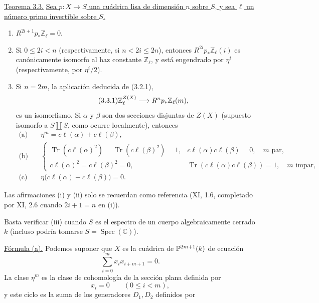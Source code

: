 \medskip
\noindent\underline{Teorema 3.3.}\quad
\underline{Sea $p:X\longrightarrow S$ una cuádrica lisa de dimensión $n$
sobre $S$, y sea $\ell$ un número primo invertible sobre $S$.}

\begin{enumerate}[label=(\roman*),leftmargin=2.6em]
\item $R^{2i+1}p_*\mathbb Z_\ell=0$.

\pageoriginale

\item Si $0\leq2i<n$ (respectivamente, si $n<2i\leq2n$), entonces
$R^{2i}p_*\mathbb Z_\ell(i)$ es canónicamente isomorfo al haz constante
$\mathbb Z_\ell$, y está engendrado por $\eta^i$ (respectivamente, por
$\eta^i/2$).

\item Si $n=2m$, la aplicación deducida de (3.2.1),
\begin{equation}\tag{\sisi{3.2.1}{3.3.1}}
\mathbb Z_\ell^{Z(X)}\longrightarrow R^np_*\mathbb Z_\ell(m),
\end{equation}
es un isomorfismo. Si $\alpha$ y $\beta$ son dos secciones disjuntas de
$Z(X)$ (supuesto isomorfo a $S\amalg S$, como ocurre localmente), entonces
\begin{align*}
\text{(a)}\quad &\eta^m=c\ell(\alpha)+c\ell(\beta),\\[1ex]
\text{(b)}\quad &
\begin{cases}
\operatorname{Tr}(c\ell(\alpha)^2)
=\operatorname{Tr}(c\ell(\beta)^2)=1,
& c\ell(\alpha)c\ell(\beta)=0,\quad m\text{ par},\\[1ex]
c\ell(\alpha)^2=c\ell(\beta)^2=0,
& \operatorname{Tr}(c\ell(\alpha)c\ell(\beta))=1,
  \quad m\text{ impar},
\end{cases}\\[1ex]
\text{(c)}\quad &\eta\bigl(c\ell(\alpha)-c\ell(\beta)\bigr)=0.
\end{align*}
\end{enumerate}


Las afirmaciones (i) y (ii) solo se recuerdan como referencia (XI, 1.6,
completado por XI, 2.6 cuando $2i+1=n$ en (i)).

Basta verificar (iii) cuando $S$ es el espectro de un cuerpo
algebraicamente cerrado $k$ (incluso podría tomarse
$S=\operatorname{Spec}(\mathbb C)$).

\underline{Fórmula (a).} Podemos suponer que $X$ es la cuádrica de
$\mathbb P^{\sisi{m+1}{2m+1}}(k)$ de ecuación
\begin{equation*}
\sum_{i=0}^{m}x_i x_{i+m+1}=0.
\end{equation*}
La clase $\eta^m$ es la clase de cohomología de la sección plana definida
por
\begin{equation*}
x_i=0\qquad(0\leq i<m),
\end{equation*}
y este ciclo es la suma de los generadores $D_1,D_2$ definidos por

